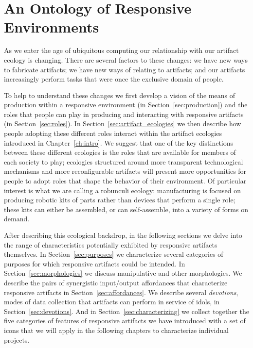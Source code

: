 \chapter{An Ontology of Responsive Environments}
\label{ch:ontology}
%
As we enter the age of ubiquitous computing our relationship with our artifact ecology is changing. 
There are several factors to these changes: we have new ways to fabricate artifacts; we have new ways of relating to artifacts; and our artifacts increasingly perform tasks that were once the exclusive domain of people.

To help to understand these changes we first develop a vision of the means of production within a responsive environment (in Section~\ref{sec:production}) and the roles that people can play in producing and interacting with responsive artifacts (in Section~\ref{sec:roles}). In Section~\ref{sec:artifact_ecologies} we then describe how people adopting these different roles interact within the artifact ecologies introduced in Chapter~\ref{ch:intro}. 
We suggest that one of the key distinctions between these different ecologies is the roles that are available for members of each society to play; ecologies structured around more transparent technological mechanisms and more reconfigurable artifacts will present more opportunities for people to adopt roles that shape the behavior of their environment. 
Of particular interest is what we are calling a robunculi ecology: manufacturing is focused on producing robotic kits of parts rather than devices that perform a single role; these kits can either be assembled, or can self-assemble, into a variety of forms on demand.

After describing this ecological backdrop, in the following sections we delve into the range of characteristics potentially exhibited by responsive artifacts themselves. In Section~\ref{sec:purposes} we characterize several categories of purposes for which responsive artifacts could be intended. In Section~\ref{sec:morphologies} we discuss manipulative and other morphologies. We describe the pairs of synergistic input/output affordances that characterize responsive artifacts in Section~\ref{sec:affordances}. We describe several \emph{devotions}, modes of data collection that artifacts can perform in service of idols, in Section~\ref{sec:devotions}. And in Section~\ref{sec:characterizing} we collect together the five categories of features of responsive artifacts we have introduced with a set of icons that we will apply in the following chapters to characterize individual projects.

